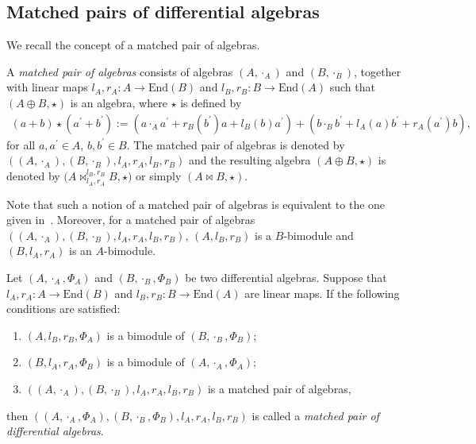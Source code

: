 \documentclass[10pt,a4paper]{amsart}
\numberwithin{equation}{section}
\newcommand{\End}{\mathrm{End}}
\begin{document}
\subsection{Matched pairs of differential algebras}\label{subsec:matched_pair}
We recall the concept of a matched pair of algebras.

\begin{Definition} A \textit{matched pair of algebras} consists of algebras $(A, \cdot_A)$ and $(B, \cdot_B)$,
 together with linear maps $l_A, r_A\colon A \to \End(B)$ and $l_B, r_B: B \to \End(A)$
 such that $(A \oplus B, \star)$ is an algebra, where $\star$ is defined by
 \begin{gather}
 (a + b) \star (a^\prime + b^\prime) := (a \cdot_A a^\prime + r_B(b^\prime)a + l_B(b)a^\prime) + (b \cdot_B b^\prime + l_A(a)b^\prime + r_A(a^\prime)b), \label{eq:multsum}
 \end{gather}
for all $a, a^\prime \in A$, $b, b^\prime \in B$. The matched pair of algebras is denoted by $((A, \cdot_A), (B, \cdot_B), l_A, r_A,\allowbreak l_B, r_B)$ and the resulting algebra $(A \oplus B, \star)$ is denoted by $\big(A \bowtie^{l_B,r_B}_{l_A,r_A} B, \star\big)$ or simply $(A \bowtie B, \star)$.
\end{Definition}

Note that such a notion of a matched pair of algebras is equivalent to the one given in~\cite[Definition~2.1.5]{BaiDouble}.
Moreover, for a matched pair of algebras $((A, \cdot_A), (B, \cdot_B), l_A, r_A, l_B, r_B)$, $(A, l_B, r_B)$ is a $B$-bimodule and $(B, l_A, r_A)$ is an $A$-bimodule.

\begin{Definition}
 Let $(A, \cdot_A, \Phi_A)$ and $(B, \cdot_B, \Phi_B)$ be two differential algebras.
 Suppose that $l_A, r_A\colon A \to \End(B)$ and $l_B, r_B\colon B \to \End(A)$ are linear maps.
 If the following conditions are satisfied:
 \begin{enumerate}\itemsep=0pt
 \item[(1)] $(A, l_B, r_B, \Phi_A)$ is a bimodule of $(B, \cdot_B, \Phi_B)$;
 \item[(2)] $(B, l_A, r_A, \Phi_B)$ is a bimodule of $(A, \cdot_A, \Phi_A)$;
 \item[(3)] $((A, \cdot_A), (B, \cdot_B), l_A, r_A, l_B, r_B)$ is a matched pair of algebras,
 \end{enumerate}
 then $((A, \cdot_A, \Phi_A), (B, \cdot_B, \Phi_B), l_A, r_A, l_B, r_B)$ is called a \textit{matched pair of differential algebras}.
\end{Definition}
\end{document}

